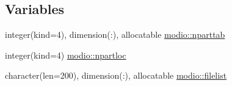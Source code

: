 \subsection*{Variables}
\begin{DoxyCompactItemize}
\item 
integer(kind=4), dimension(\+:), allocatable \hyperlink{namespacemodio_a4a7b05300378789a7f94a217ba703153}{modio\+::nparttab}
\item 
integer(kind=4) \hyperlink{namespacemodio_a0bf1df6ff1e675aabce26f3d7289a700}{modio\+::npartloc}
\item 
character(len=200), dimension(\+:), allocatable \hyperlink{namespacemodio_a31e8a393faa96e92df4d56794cd2eadd}{modio\+::filelist}
\end{DoxyCompactItemize}
